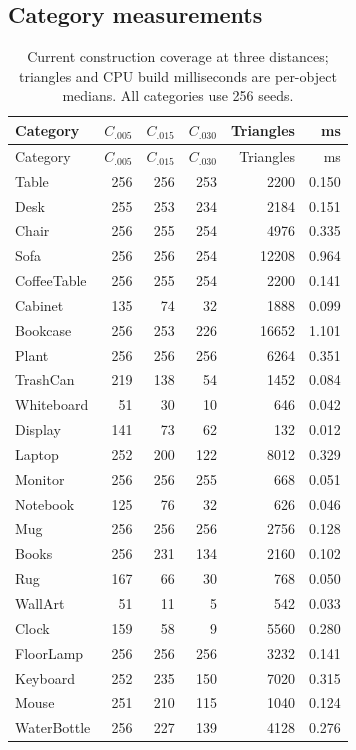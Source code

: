 \subsection{Category measurements}
\small
\begin{longtable}{lrrr r r}
\caption{Current construction coverage at three distances; triangles and CPU build milliseconds are per-object medians. All categories use 256 seeds.}\\
\toprule Category & $C_{.005}$ & $C_{.015}$ & $C_{.030}$ & Triangles & ms \\\midrule
\endfirsthead
\toprule Category & $C_{.005}$ & $C_{.015}$ & $C_{.030}$ & Triangles & ms \\\midrule
\endhead
Table & 256 & 256 & 253 & 2200 & 0.150 \\
Desk & 255 & 253 & 234 & 2184 & 0.151 \\
Chair & 256 & 255 & 254 & 4976 & 0.335 \\
Sofa & 256 & 256 & 254 & 12208 & 0.964 \\
CoffeeTable & 256 & 255 & 254 & 2200 & 0.141 \\
Cabinet & 135 & 74 & 32 & 1888 & 0.099 \\
Bookcase & 256 & 253 & 226 & 16652 & 1.101 \\
Plant & 256 & 256 & 256 & 6264 & 0.351 \\
TrashCan & 219 & 138 & 54 & 1452 & 0.084 \\
Whiteboard & 51 & 30 & 10 & 646 & 0.042 \\
Display & 141 & 73 & 62 & 132 & 0.012 \\
Laptop & 252 & 200 & 122 & 8012 & 0.329 \\
Monitor & 256 & 256 & 255 & 668 & 0.051 \\
Notebook & 125 & 76 & 32 & 626 & 0.046 \\
Mug & 256 & 256 & 256 & 2756 & 0.128 \\
Books & 256 & 231 & 134 & 2160 & 0.102 \\
Rug & 167 & 66 & 30 & 768 & 0.050 \\
WallArt & 51 & 11 & 5 & 542 & 0.033 \\
Clock & 159 & 58 & 9 & 5560 & 0.280 \\
FloorLamp & 256 & 256 & 256 & 3232 & 0.141 \\
Keyboard & 252 & 235 & 150 & 7020 & 0.315 \\
Mouse & 251 & 210 & 115 & 1040 & 0.124 \\
WaterBottle & 256 & 227 & 139 & 4128 & 0.276 \\

\end{longtable}

